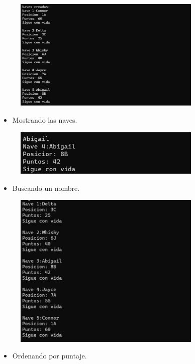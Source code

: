 \documentclass{article}
\begin{document}
	\begin{figure}[H]
		\centering
		\includegraphics[width=0.8\textwidth,keepaspectratio]{img/captura1.png}
	\end{figure}
	\begin{itemize}
		\item Mostrando las naves.
	\end{itemize}
	
	\begin{figure}[H]
		\centering
		\includegraphics[width=0.8\textwidth,keepaspectratio]{img/captura2.png}
	\end{figure}
	\begin{itemize}
		\item Buscando un nombre.
	\end{itemize}
	
	\begin{figure}[H]
		\centering
		\includegraphics[width=0.8\textwidth,keepaspectratio]{img/captura3.png}
	\end{figure}
	\begin{itemize}
		\item Ordenando por puntaje.
	\end{itemize}
	
\end{document}
